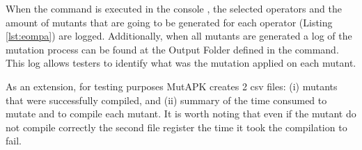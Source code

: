 When the command is executed in the console ,  the selected operators and the amount of mutants that are going to be generated for each operator (Listing \ref{lst:eompa}) are logged. Additionally, when all mutants are generated a log of the mutation process can be found at the Output Folder defined in the command. This log allows testers to identify what was the mutation applied on each mutant.

As an extension, for testing purposes MutAPK creates 2 csv files: (i) mutants that were successfully compiled, and (ii) summary of the time consumed to mutate and to compile each mutant. It is worth noting that even if the mutant do not compile correctly the second file register the time it took the compilation to fail.





















